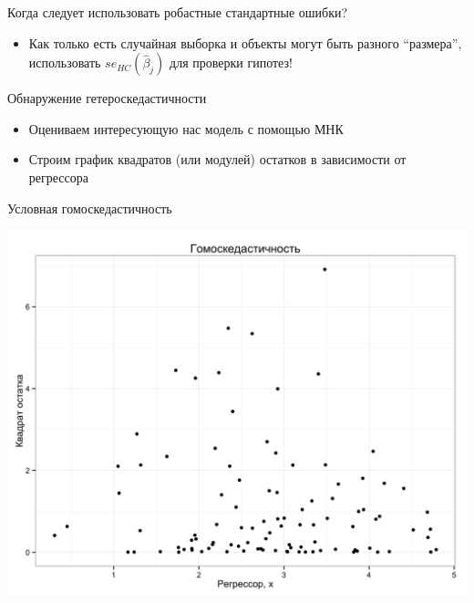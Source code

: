 \documentclass[ignorenonframetext,]{beamer}
\begin{document}
\begin{frame}{Когда следует использовать робастные стандартные ошибки?}

\begin{itemize}
\itemsep1pt\parskip0pt
\item
  Как только есть случайная выборка и объекты могут быть разного
  ``размера'', использовать \(se_{HC}(\hat{\beta}_j)\) для проверки
  гипотез!
\end{itemize}

\end{frame}

\begin{frame}{Обнаружение гетероскедастичности}

\begin{itemize}
\item
  Оцениваем интересующую нас модель с помощью МНК
\item
  Строим график квадратов (или модулей) остатков в зависимости от
  регрессора
\end{itemize}

\end{frame}

\begin{frame}{Условная гомоскедастичность}

\includegraphics{graph_01_gomo.png}

\end{frame}
\end{document}
